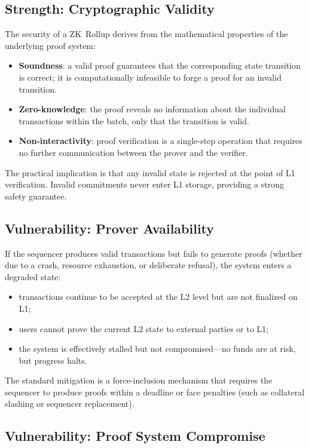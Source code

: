 \subsection{Strength: Cryptographic Validity}

The security of a ZK~Rollup derives from the mathematical properties of the underlying proof system:
\begin{itemize}
    \item \textbf{Soundness}: a valid proof guarantees that the corresponding state transition is correct; it is computationally infeasible to forge a proof for an invalid transition.
    \item \textbf{Zero-knowledge}: the proof reveals no information about the individual transactions within the batch, only that the transition is valid.
    \item \textbf{Non-interactivity}: proof verification is a single-step operation that requires no further communication between the prover and the verifier.
\end{itemize}

The practical implication is that any invalid state is rejected at the point of L1 verification. Invalid commitments never enter L1 storage, providing a strong safety guarantee.

\subsection{Vulnerability: Prover Availability}

If the sequencer produces valid transactions but fails to generate proofs (whether due to a crash, resource exhaustion, or deliberate refusal), the system enters a degraded state:
\begin{itemize}
    \item transactions continue to be accepted at the L2 level but are not finalized on L1;
    \item users cannot prove the current L2 state to external parties or to L1;
    \item the system is effectively stalled but not compromised---no funds are at risk, but progress halts.
\end{itemize}

The standard mitigation is a force-inclusion mechanism that requires the sequencer to produce proofs within a deadline or face penalties (such as collateral slashing or sequencer replacement).

\subsection{Vulnerability: Proof System Compromise}

